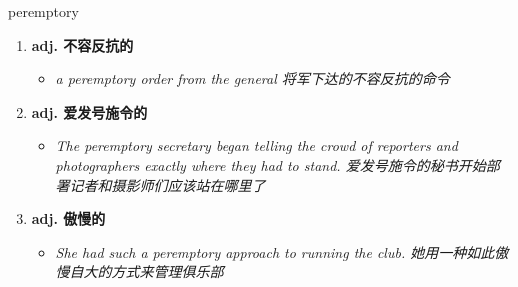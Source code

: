 
\begin{frame}
{\huge peremptory}
\begin{center}
\begin{enumerate}\Large
  \item \textbf{adj. 不容反抗的}
  \begin{itemize}
    \item \em{\Large{a peremptory order from the general 将军下达的不容反抗的命令}}
  \end{itemize}
  \item \textbf{adj. 爱发号施令的}
  \begin{itemize}
    \item \em{\Large{The peremptory secretary began telling the crowd of reporters and photographers exactly where they had to stand. 爱发号施令的秘书开始部署记者和摄影师们应该站在哪里了}}
  \end{itemize}
  \item \textbf{adj. 傲慢的}
  \begin{itemize}
    \item \em{\Large{She had such a peremptory approach to running the club. 她用一种如此傲慢自大的方式来管理俱乐部}}
  \end{itemize}
\end{enumerate}
\end{center}
\end{frame}
